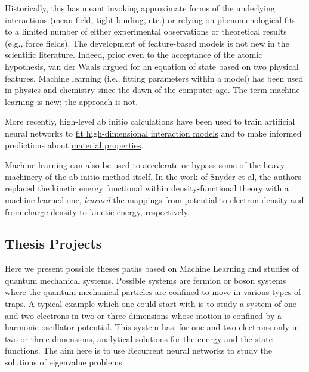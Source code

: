 \documentclass[%
oneside,                 %
final,                   %
10pt]{article}
\begin{document}
Historically, this has meant invoking
approximate forms of the underlying interactions (mean field, tight
binding, etc.) or relying on phenomenological fits to a limited number
of either experimental observations or theoretical results (e.g., force fields). 
The development of feature-based models is not
new in the scientific literature. Indeed, prior even to the acceptance
of the atomic hypothesis, van der Waals argued for an equation of
state based on two physical features. Machine learning (i.e.,
fitting parameters within a model) has been used in physics and
chemistry since the dawn of the computer age. The term machine
learning is new; the approach is not.

More recently, high-level ab initio calculations have been used to
train artificial neural networks to \href{{http://www.sciencedirect.com/science/article/pii/S0927025615007806?via%
models}  and to make informed predictions about \href{{https://www.nature.com/articles/srep40827}}{material properties}. 

Machine learning can also be used to accelerate or bypass some of the
heavy machinery of the ab initio method itself. In the work of \href{{https://journals.aps.org/prl/abstract/10.1103/PhysRevLett.108.253002}}{Snyder et al},  the authors
replaced the kinetic energy functional within density-functional
theory with a machine-learned one, 
\emph{learned} the mappings from potential to electron density and from
charge density to kinetic energy, respectively.

\subsection*{Thesis Projects}

Here we present possible theses paths based on Machine Learning and
studies of quantum mechanical systems.  Possible systems are fermion
or boson systems where the quantum mechanical particles are confined
to move in various types of traps. A typical example which one could
start with is to study a system of one and two electrons in two or three
dimensions whose motion is confined by a harmonic  oscillator potential. This
system has, for one and two electrons only in two or three dimensions,
analytical solutions for the energy and the state
functions. The aim here is to use Recurrent neural networks to study the solutions of eigenvalue problems.
\end{document}
